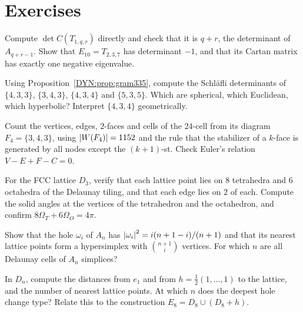 \section*{Exercises}

\begin{exercise}
Compute $\det C(T_{1,q,r})$ directly and check that it is $q+r$, the determinant of $A_{q+r-1}$. Show that
$E_{10}=T_{2,3,7}$ has determinant $-1$, and that its Cartan matrix has exactly one negative eigenvalue.
\end{exercise}

\begin{exercise}
Using Proposition~\ref{DYN:prop:gram335}, compute the Schl\"afli determinants of $\{4,3,3\}$, $\{3,4,3\}$,
$\{4,3,4\}$ and $\{5,3,5\}$. Which are spherical, which Euclidean, which hyperbolic? Interpret
$\{4,3,4\}$ geometrically.
\end{exercise}

\begin{exercise}
Count the vertices, edges, $2$-faces and cells of the $24$-cell from its diagram $F_4=\{3,4,3\}$, using
$\left\lvert W(F_4) \right\rvert=1152$ and the rule that the stabilizer of a $k$-face is generated by all nodes except the
$(k+1)$-st. Check Euler's relation $V-E+F-C=0$.
\end{exercise}

\begin{exercise}
For the FCC lattice $D_3$, verify that each lattice point lies on $8$ tetrahedra and $6$ octahedra of the
Delaunay tiling, and that each edge lies on $2$ of each. Compute the solid angles at the vertices of the
tetrahedron and the octahedron, and confirm $8\Omega_T+6\Omega_O=4\pi$.
\end{exercise}

\begin{exercise}
Show that the hole $\omega_i$ of $A_n$ has $\left\lvert \omega_i \right\rvert^2=i(n+1-i)/(n+1)$ and that its nearest lattice
points form a hypersimplex with $\binom{n+1}i$ vertices. For which $n$ are all Delaunay cells of $A_n$
simplices?
\end{exercise}

\begin{exercise}
In $D_n$, compute the distances from $e_1$ and from $h=\frac12(1,\dots,1)$ to the lattice, and the number of
nearest lattice points. At which $n$ does the deepest hole change type? Relate this to the construction
$E_8=D_8\cup(D_8+h)$.
\end{exercise}

